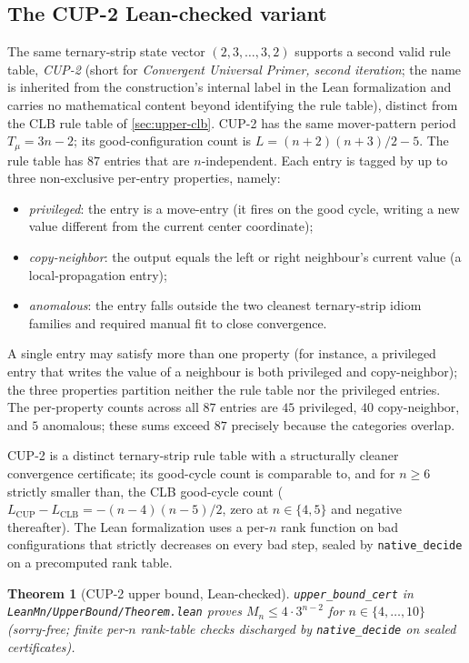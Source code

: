 \documentclass[11pt,a4paper]{article}
\theoremstyle{plain}
\newtheorem{theorem}{Theorem}
\theoremstyle{definition}
\newcommand{\Mn}{M_n}
\begin{document}
\subsection{The CUP-2 Lean-checked variant}\label{sec:upper-cup2}

The same ternary-strip state vector $(2, 3, \ldots, 3, 2)$ supports a
second valid rule table, \emph{CUP-2} (short for \emph{Convergent
Universal Primer, second iteration}; the name is inherited from the
construction's internal label in the Lean formalization and carries
no mathematical content beyond identifying the rule table), distinct
from the CLB rule table of \cref{sec:upper-clb}.  CUP-2 has the same
mover-pattern period $T_\mu = 3n - 2$; its good-configuration count is
$L = (n+2)(n+3)/2 - 5$.  The rule table has $87$ entries that are
$n$-independent.  Each entry is tagged by up to three non-exclusive
per-entry properties, namely:
\begin{itemize}[leftmargin=*]
\item \emph{privileged}: the entry is a move-entry (it fires on
the good cycle, writing a new value different from the current
center coordinate);
\item \emph{copy-neighbor}: the output equals the left or right
neighbour's current value (a local-propagation entry);
\item \emph{anomalous}: the entry falls outside the two cleanest
ternary-strip idiom families and required manual fit to close
convergence.
\end{itemize}
A single entry may satisfy more than one property (for instance, a
privileged entry that writes the value of a neighbour is both
privileged and copy-neighbor); the three properties partition neither
the rule table nor the privileged entries.  The per-property counts
across all $87$ entries are $45$ privileged, $40$ copy-neighbor, and
$5$ anomalous; these sums exceed $87$ precisely because the
categories overlap.

CUP-2 is a distinct ternary-strip rule table with a structurally
cleaner convergence certificate; its good-cycle count is comparable
to, and for $n \ge 6$ strictly smaller than, the CLB good-cycle count
($L_{\mathrm{CUP}} - L_{\mathrm{CLB}} = -(n-4)(n-5)/2$, zero at
$n \in \{4, 5\}$ and negative thereafter).  The Lean formalization
uses a per-$n$ rank function on bad configurations that strictly
decreases on every bad step, sealed by \texttt{native\_decide} on a
precomputed rank table.

\begin{theorem}[CUP-2 upper bound, Lean-checked]\label{thm:upper-bound-cert}
\texttt{upper\_bound\_cert} in \texttt{LeanMn/UpperBound/Theorem.lean}
proves $\Mn \le 4 \cdot 3^{n-2}$ for $n \in \{4, \ldots, 10\}$
(sorry-free; finite per-$n$ rank-table checks discharged by
\texttt{native\_decide} on sealed certificates).
\end{theorem}
\end{document}
